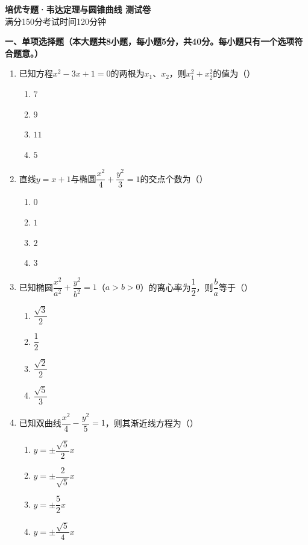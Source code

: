 \documentclass[12pt, a4paper]{ctexart}
\begin{document}
\begin{center}
{\Large\bfseries 培优专题·韦达定理与圆锥曲线 测试卷}\\[0.5em]
{\normalsize 满分150分\quad 考试时间120分钟}
\end{center}

\vspace{0.5em}

\noindent\textbf{一、单项选择题（本大题共8小题，每小题5分，共40分。每小题只有一个选项符合题意。）}

\begin{enumerate}[label=\Alph*.]

\item 已知方程$x^2-3x+1=0$的两根为$x_1$、$x_2$，则$x_1^2+x_2^2$的值为（\quad）
\begin{enumerate}[label=]
\item $7$ \qquad \item $9$ \qquad \item $11$ \qquad \item $5$
\end{enumerate}

\item 直线$y=x+1$与椭圆$\dfrac{x^2}{4}+\dfrac{y^2}{3}=1$的交点个数为（\quad）
\begin{enumerate}[label=]
\item $0$ \qquad \item $1$ \qquad \item $2$ \qquad \item $3$
\end{enumerate}

\item 已知椭圆$\dfrac{x^2}{a^2}+\dfrac{y^2}{b^2}=1$（$a>b>0$）的离心率为$\dfrac{1}{2}$，则$\dfrac{b}{a}$等于（\quad）
\begin{enumerate}[label=]
\item $\dfrac{\sqrt{3}}{2}$ \qquad \item $\dfrac{1}{2}$ \qquad \item $\dfrac{\sqrt{2}}{2}$ \qquad \item $\dfrac{\sqrt{5}}{3}$
\end{enumerate}

\item 已知双曲线$\dfrac{x^2}{4}-\dfrac{y^2}{5}=1$，则其渐近线方程为（\quad）
\begin{enumerate}[label=]
\item $y=\pm\dfrac{\sqrt{5}}{2}x$ \qquad \item $y=\pm\dfrac{2}{\sqrt{5}}x$ \qquad \item $y=\pm\dfrac{5}{2}x$ \qquad \item $y=\pm\dfrac{\sqrt{5}}{4}x$
\end{enumerate}


\end{enumerate}
\end{document}
